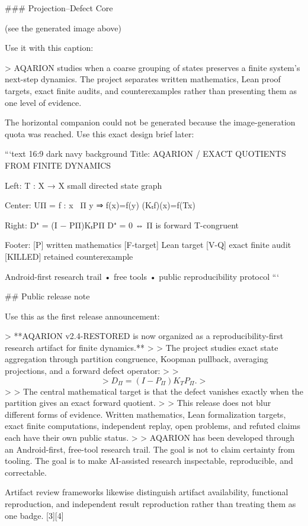 ### Projection–Defect Core

(see the generated image above)

Use it with this caption:

> AQARION studies when a coarse grouping of states preserves a finite system’s next-step dynamics. The project separates written mathematics, Lean proof targets, exact finite audits, and counterexamples rather than presenting them as one level of evidence.

The horizontal companion could not be generated because the image-generation quota was reached. Use this exact design brief later:

```text
16:9 dark navy background
Title:
AQARION / EXACT QUOTIENTS FROM FINITE DYNAMICS

Left:
T : X → X
small directed state graph

Center:
UΠ = {f : x ~Π y ⇒ f(x)=f(y)}
(Kₜf)(x)=f(Tx)

Right:
D⁺ = (I − PΠ)KₜPΠ
D⁺ = 0 ⇔ Π is forward T-congruent

Footer:
[P] written mathematics
[F-target] Lean target
[V-Q] exact finite audit
[KILLED] retained counterexample

Android-first research trail • free tools • public reproducibility protocol
```

## Public release note

Use this as the first release announcement:

> **AQARION v2.4-RESTORED is now organized as a reproducibility-first research artifact for finite dynamics.**
>
> The project studies exact state aggregation through partition congruence, Koopman pullback, averaging projections, and a forward defect operator:
>
> $$
> D_\Pi=(I-P_\Pi)K_TP_\Pi.
> $$
>
> The central mathematical target is that the defect vanishes exactly when the partition gives an exact forward quotient.
>
> This release does not blur different forms of evidence. Written mathematics, Lean formalization targets, exact finite computations, independent replay, open problems, and refuted claims each have their own public status.
>
> AQARION has been developed through an Android-first, free-tool research trail. The goal is not to claim certainty from tooling. The goal is to make AI-assisted research inspectable, reproducible, and correctable.

Artifact review frameworks likewise distinguish artifact availability, functional reproduction, and independent result reproduction rather than treating them as one badge. [3][4]

